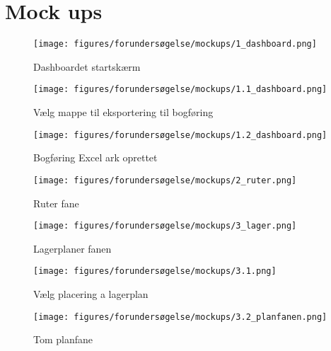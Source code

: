 \chapter{Mock ups}\label{app:mockups}
\begin{figure}
    \centering
    \texttt{[image: figures/forundersøgelse/mockups/1\_dashboard.png]}
    \caption{Dashboardet startskærm}
    \label{fig:1dashboard}
\end{figure}

\begin{figure}
    \centering
    \texttt{[image: figures/forundersøgelse/mockups/1.1\_dashboard.png]}
    \caption{Vælg mappe til eksportering til bogføring}
    \label{fig:11dashboard}
\end{figure}

\begin{figure}
    \centering
    \texttt{[image: figures/forundersøgelse/mockups/1.2\_dashboard.png]}
    \caption{Bogføring Excel ark oprettet}
    \label{fig:12dashboard}
\end{figure}

\begin{figure}
    \centering
    \texttt{[image: figures/forundersøgelse/mockups/2\_ruter.png]}
    \caption{Ruter fane}
    \label{fig:2routes}
\end{figure}

\begin{figure}
    \centering
    \texttt{[image: figures/forundersøgelse/mockups/3\_lager.png]}
    \caption{Lagerplaner fanen}
    \label{fig:3storage}
\end{figure}

\begin{figure}
    \centering
    \texttt{[image: figures/forundersøgelse/mockups/3.1.png]}
    \caption{Vælg placering a lagerplan}
    \label{fig:31storage}
\end{figure}

\begin{figure}
    \centering
    \texttt{[image: figures/forundersøgelse/mockups/3.2\_planfanen.png]}
    \caption{Tom planfane}
    \label{fig:31storage}
\end{figure}
